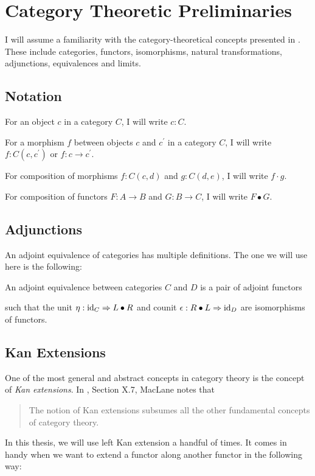 \chapter{Category Theoretic Preliminaries}

I will assume a familiarity with the category-theoretical concepts presented in \cite{CT4P}. These include categories, functors, isomorphisms, natural transformations, adjunctions, equivalences and limits.

\section{Notation}
For an object $ c $ in a category $ C $, I will write $ c: C $.

For a morphism $ f $ between objects $ c $ and $ c^\prime $ in a category $ C $, I will write $ f: C(c, c^\prime) $ or $ f: c \to c^\prime $.

For composition of morphisms $ f: C(c, d) $ and $ g: C(d, e) $, I will write $ f \cdot g $.

For composition of functors $ F: A \to B $ and $ G: B \to C $, I will write $ F \bullet G $.

\section{Adjunctions}
An adjoint equivalence of categories has multiple definitions. The one we will use here is the following:


\begin{definition}
  An adjoint equivalence between categories $ C $ and $ D $ is a pair of adjoint functors
  \begin{center}
  \end{center}
  such that the unit $ \eta: \text{id}_{C} \Rightarrow L \bullet R $ and counit $ \epsilon: R \bullet L \Rightarrow \text{id}_{D} $ are isomorphisms of functors.
\end{definition}


\section{Kan Extensions}
One of the most general and abstract concepts in category theory is the concept of \textit{Kan extensions}. In \cite{MacLane}, Section X.7, MacLane notes that
\begin{quote}
  The notion of Kan extensions subsumes all the other fundamental concepts of category theory.
\end{quote}
In this thesis, we will use left Kan extension a handful of times. It comes in handy when we want to extend a functor along another functor in the following way:

